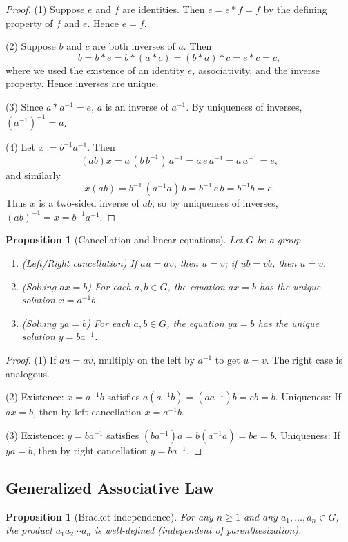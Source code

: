 \documentclass[12pt]{article}
\newtheorem{proposition}[theorem]{Proposition}
\theoremstyle{definition}
\begin{document}
\begin{proof}
(1) Suppose $e$ and $f$ are identities. Then $e=e*f=f$ by the defining property of $f$ and $e$. Hence $e=f$.

(2) Suppose $b$ and $c$ are both inverses of $a$. Then
\[
b = b*e = b*(a*c) = (b*a)*c = e*c = c,
\]
where we used the existence of an identity $e$, associativity, and the inverse property. Hence inverses are unique.

(3) Since $a*a^{-1}=e$, $a$ is an inverse of $a^{-1}$. By uniqueness of inverses, $(a^{-1})^{-1}=a$.

(4) Let $x:=b^{-1}a^{-1}$. Then
\[
(ab)x = a\,(b\,b^{-1})\,a^{-1} = a\,e\,a^{-1} = a\,a^{-1} = e,
\]
and similarly
\[
x(ab) = b^{-1}\,(a^{-1}a)\,b = b^{-1}\,e\,b = b^{-1}b = e.
\]
Thus $x$ is a two-sided inverse of $ab$, so by uniqueness of inverses, $(ab)^{-1}=x=b^{-1}a^{-1}$.
\end{proof}

\begin{proposition}[Cancellation and linear equations]
Let $G$ be a group.
\begin{enumerate}
    \item (Left/Right cancellation) If $au=av$, then $u=v$; if $ub=vb$, then $u=v$.
    \item (Solving $ax=b$) For each $a,b\in G$, the equation $ax=b$ has the unique solution $x=a^{-1}b$.
    \item (Solving $ya=b$) For each $a,b\in G$, the equation $ya=b$ has the unique solution $y=ba^{-1}$.
\end{enumerate}
\end{proposition}

\begin{proof}
(1) If $au=av$, multiply on the left by $a^{-1}$ to get $u=v$. The right case is analogous.

(2) Existence: $x=a^{-1}b$ satisfies $a(a^{-1}b)=(aa^{-1})b=eb=b$. Uniqueness: If $ax=b$, then by left cancellation $x=a^{-1}b$.

(3) Existence: $y=ba^{-1}$ satisfies $(ba^{-1})a=b(a^{-1}a)=be=b$. Uniqueness: If $ya=b$, then by right cancellation $y=ba^{-1}$.
\end{proof}

\subsection*{Generalized Associative Law}

\begin{proposition}[Bracket independence]
For any $n\ge 1$ and any $a_1,\dots,a_n\in G$, the product $a_1a_2\cdots a_n$ is well-defined (independent of parenthesization).
\end{proposition}
\end{document}
